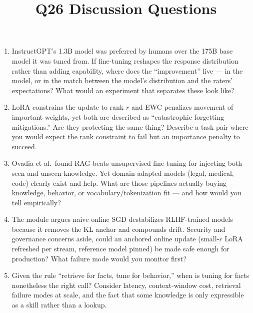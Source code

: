 \documentclass[11pt]{article}
\title{Q26 Discussion Questions}
\date{}
\begin{document}
\maketitle
\begin{enumerate}[noitemsep]
\item InstructGPT's 1.3B model was preferred by humans over the 175B base model it was tuned from. If fine-tuning reshapes the response distribution rather than adding capability, where does the ``improvement'' live --- in the model, or in the match between the model's distribution and the raters' expectations? What would an experiment that separates these look like?
\item LoRA constrains the update to rank $r$ and EWC penalizes movement of important weights, yet both are described as ``catastrophic forgetting mitigations.'' Are they protecting the same thing? Describe a task pair where you would expect the rank constraint to fail but an importance penalty to succeed.
\item Ovadia et al.\ found RAG beats unsupervised fine-tuning for injecting both seen and unseen knowledge. Yet domain-adapted models (legal, medical, code) clearly exist and help. What are those pipelines actually buying --- knowledge, behavior, or vocabulary/tokenization fit --- and how would you tell empirically?
\item The module argues naive online SGD destabilizes RLHF-trained models because it removes the KL anchor and compounds drift. Security and governance concerns aside, could an anchored online update (small-$r$ LoRA refreshed per stream, reference model pinned) be made safe enough for production? What failure mode would you monitor first?
\item Given the rule ``retrieve for facts, tune for behavior,'' when is tuning for facts nonetheless the right call? Consider latency, context-window cost, retrieval failure modes at scale, and the fact that some knowledge is only expressible as a skill rather than a lookup.
\end{enumerate}
\end{document}
